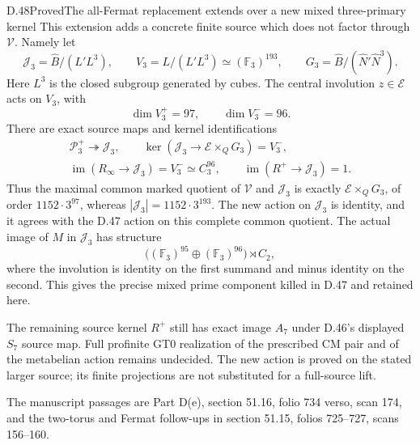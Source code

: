 \begin{statement}{D.48}{Proved}{The all-Fermat replacement extends over a new mixed three-primary kernel}
This extension adds a concrete finite source which does not
factor through \(\mathcal V\). Namely let
\[
 \mathcal J_3=\widehat B/(L'L^3),\qquad
 V_3=L/(L'L^3)\simeq(\mathbb F_3)^{193},\qquad
 G_3=\widehat B/(\widehat N'\widehat N^3).
                                                               \tag{D.48.7}
\]
Here \(L^3\) is the closed subgroup generated by cubes.
The central involution \(z\in\mathcal E\) acts on \(V_3\), with
\[
 \dim V_3^+=97,\qquad\dim V_3^-=96.
                                                               \tag{D.48.8}
\]
There are exact source maps and kernel identifications
\[
 \begin{gathered}
 \mathcal P_3^+\twoheadrightarrow\mathcal J_3,\qquad
 \ker(\mathcal J_3\to
                 \mathcal E\times_QG_3)=V_3^-,\\
 \operatorname{im}(R_\infty\to\mathcal J_3)=V_3^-
                      \simeq C_3^{96},\qquad
 \operatorname{im}(R^+\to\mathcal J_3)=1.
 \end{gathered}                                                   \tag{D.48.9}
\]
Thus the maximal common marked quotient of
\(\mathcal V\) and \(\mathcal J_3\) is exactly
\(\mathcal E\times_QG_3\), of order \(1152\cdot3^{97}\), whereas
\(|\mathcal J_3|=1152\cdot3^{193}\).
The new action on \(\mathcal J_3\) is identity, and it agrees
with the D.47 action on this complete common quotient.
The actual image of \(M\) in \(\mathcal J_3\) has structure
\[
 \bigl((\mathbb F_3)^{95}\oplus(\mathbb F_3)^{96}\bigr)
                 \rtimes C_2,
                                                               \tag{D.48.10}
\]
where the involution is identity on the first summand and
minus identity on the second. This gives the precise mixed
prime component killed in D.47 and retained here.

The remaining source kernel \(R^+\) still has exact image
\(A_7\) under D.46's displayed \(S_7\) source map. Full
profinite GT0 realization of the prescribed CM pair and of
the metabelian action remains undecided. The new action is
proved on the stated larger source; its finite projections
are not substituted for a full-source lift.

The manuscript passages are Part D(e), section 51.16,
folio 734 verso, scan 174, and the two-torus and Fermat
follow-ups in section 51.15, folios 725--727, scans 156--160.
\end{statement}
